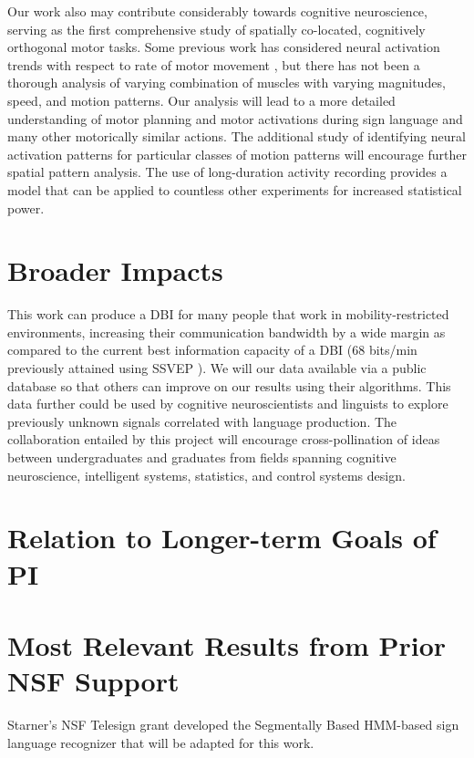 \documentclass{proposal}
\begin{document}
Our work also may contribute considerably towards cognitive neuroscience, serving as the first comprehensive study of spatially co-located, cognitively orthogonal motor tasks. Some previous work has considered neural activation trends with respect to rate of motor movement \cite{rao1996rbf}, but there has not been a thorough analysis of varying combination of muscles with varying magnitudes, speed, and motion patterns. Our analysis will lead to a more detailed understanding of motor planning and motor activations during sign language and many other motorically similar actions. The additional study of identifying neural activation patterns for particular classes of motion patterns will encourage further spatial pattern analysis. The use of long-duration activity recording provides a model that can be applied to countless other experiments for increased statistical power.


\section{Broader Impacts}

This work can produce a DBI for many people that work in mobility-restricted environments, increasing their communication bandwidth by a wide margin as compared to the current best information capacity of a DBI (68 bits/min previously attained using SSVEP \cite{gao2003bbe}). We will our data available via a public database so that others can improve on our results using their algorithms. This data further could be used by cognitive neuroscientists and linguists to explore previously unknown signals correlated with language production. The collaboration entailed by this project will encourage cross-pollination of ideas between undergraduates and graduates from fields spanning cognitive neuroscience, intelligent systems, statistics, and control systems design.


\section{Relation to Longer-term Goals of PI}

\section{Most Relevant Results from Prior NSF Support}

Starner's NSF Telesign grant developed the Segmentally Based HMM-based sign language recognizer that will be adapted for this work.
\end{document}
